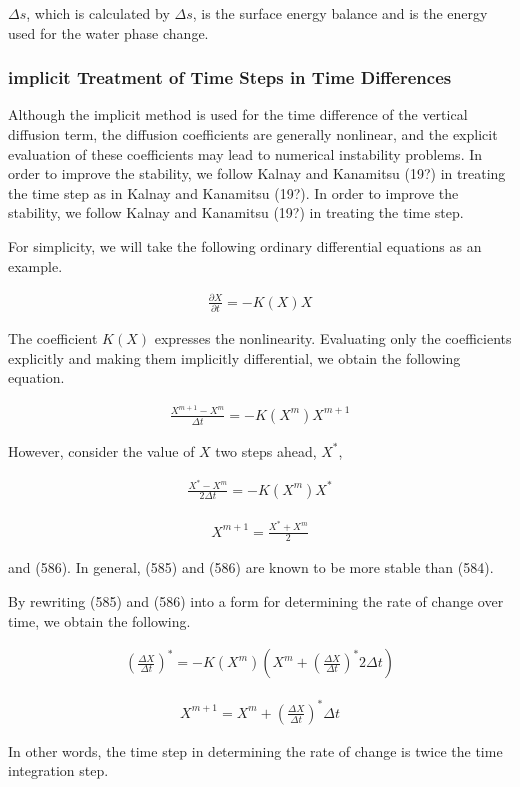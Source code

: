 \(\Delta s\), which is calculated by \(\Delta s\), is the surface energy
balance and is the energy used for the water phase change.

\hypertarget{implicit-treatment-of-time-steps-in-time-differences}{%
\subsubsection{implicit Treatment of Time Steps in Time
Differences}\label{implicit-treatment-of-time-steps-in-time-differences}}

Although the implicit method is used for the time difference of the
vertical diffusion term, the diffusion coefficients are generally
nonlinear, and the explicit evaluation of these coefficients may lead to
numerical instability problems. In order to improve the stability, we
follow Kalnay and Kanamitsu (19?) in treating the time step as in Kalnay
and Kanamitsu (19?). In order to improve the stability, we follow Kalnay
and Kanamitsu (19?) in treating the time step.

For simplicity, we will take the following ordinary differential
equations as an example.

\begin{eqnarray}
  \frac{\partial{X}}{\partial {t}} = - K(X) X
\end{eqnarray}

The coefficient \(K(X)\) expresses the nonlinearity. Evaluating only the
coefficients explicitly and making them implicitly differential, we
obtain the following equation.

\begin{eqnarray}
  \frac{X^{m+1} - X^m}{\Delta t} = - K( X^m ) X^{m+1}
\end{eqnarray}

However, consider the value of \(X\) two steps ahead, \(X^{\ast}\),

\begin{eqnarray}
  \frac{X^{\ast} - X^m}{2\Delta t} = - K ( X^m ) X^{\ast}
\end{eqnarray}

\begin{eqnarray}
  X^{m+1} = \frac{X^{\ast} + X^m}2
\end{eqnarray}

and (586). In general, (585) and (586) are known to be more stable than
(584).

By rewriting (585) and (586) into a form for determining the rate of
change over time, we obtain the following.

\begin{eqnarray}
  \left(\frac{\Delta X}{\Delta t}\right)^{\ast} =
     - K( X^m ) \left( X^m +
        \left(\frac{\Delta X}{\Delta t}\right)^{\ast}
        2 \Delta t \right)
\end{eqnarray}

\begin{eqnarray}
  X^{m+1} = X^m + \left(\frac{\Delta X}{\Delta t}\right)^{\ast} \Delta t
\end{eqnarray}

In other words, the time step in determining the rate of change is twice
the time integration step.
